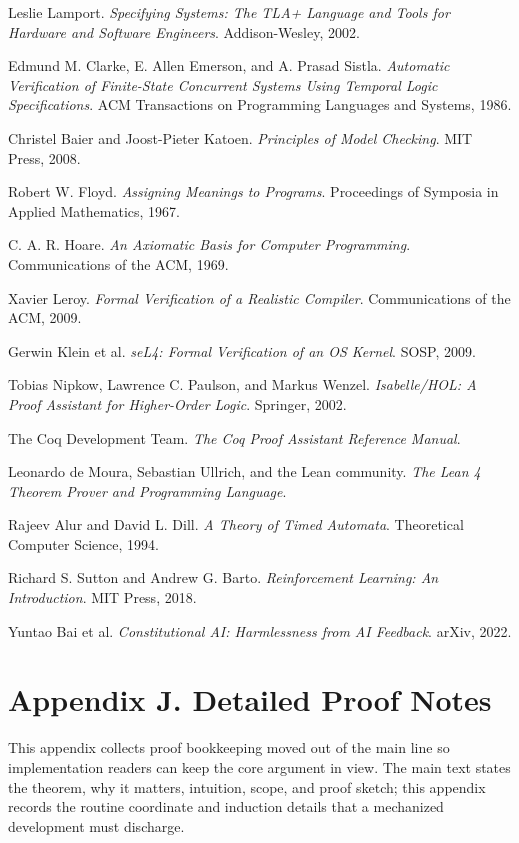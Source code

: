 \documentclass[10pt,oneside]{article}
\theoremstyle{definition}
\theoremstyle{remark}
\begin{document}
\begin{enumerate}[label={[\arabic*]}]
  \item Leslie Lamport. \emph{Specifying Systems: The TLA+ Language and Tools for Hardware and Software Engineers}. Addison-Wesley, 2002.
  \item Edmund M. Clarke, E. Allen Emerson, and A. Prasad Sistla. \emph{Automatic Verification of Finite-State Concurrent Systems Using Temporal Logic Specifications}. ACM Transactions on Programming Languages and Systems, 1986.
  \item Christel Baier and Joost-Pieter Katoen. \emph{Principles of Model Checking}. MIT Press, 2008.
  \item Robert W. Floyd. \emph{Assigning Meanings to Programs}. Proceedings of Symposia in Applied Mathematics, 1967.
  \item C. A. R. Hoare. \emph{An Axiomatic Basis for Computer Programming}. Communications of the ACM, 1969.
  \item Xavier Leroy. \emph{Formal Verification of a Realistic Compiler}. Communications of the ACM, 2009.
  \item Gerwin Klein et al. \emph{seL4: Formal Verification of an OS Kernel}. SOSP, 2009.
  \item Tobias Nipkow, Lawrence C. Paulson, and Markus Wenzel. \emph{Isabelle/HOL: A Proof Assistant for Higher-Order Logic}. Springer, 2002.
  \item The Coq Development Team. \emph{The Coq Proof Assistant Reference Manual}.
  \item Leonardo de Moura, Sebastian Ullrich, and the Lean community. \emph{The Lean 4 Theorem Prover and Programming Language}.
  \item Rajeev Alur and David L. Dill. \emph{A Theory of Timed Automata}. Theoretical Computer Science, 1994.
  \item Richard S. Sutton and Andrew G. Barto. \emph{Reinforcement Learning: An Introduction}. MIT Press, 2018.
  \item Yuntao Bai et al. \emph{Constitutional AI: Harmlessness from AI Feedback}. arXiv, 2022.
\end{enumerate}



\section{Appendix J. Detailed Proof Notes}
This appendix collects proof bookkeeping moved out of the main line so implementation readers can keep the core argument in view. The main text states the theorem, why it matters, intuition, scope, and proof sketch; this appendix records the routine coordinate and induction details that a mechanized development must discharge.
\end{document}
